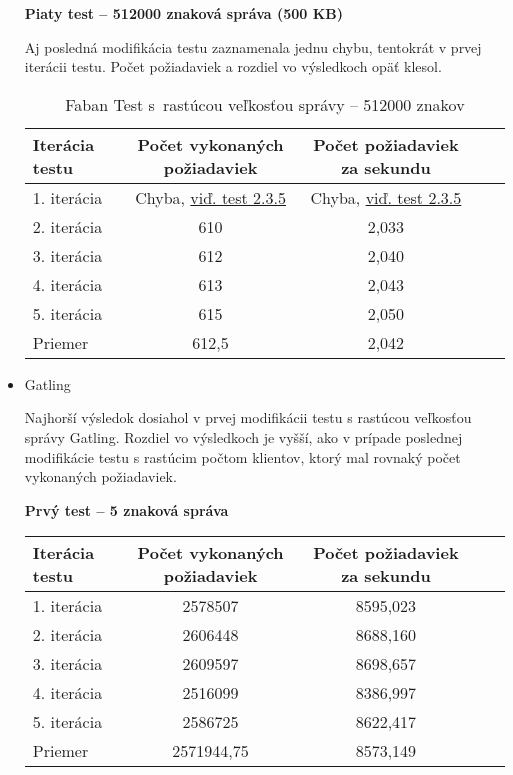 \documentclass[12pt,oneside,final]{fithesis-utf8}
\begin{document}
\begin{itemize}
\textbf{Piaty test -- 512000 znaková správa (500 KB)}

Aj posledná modifikácia testu zaznamenala jednu chybu, tentokrát v prvej iterácii testu. Počet požiadaviek a rozdiel vo výsledkoch opäť klesol.

\begin{table}[H]
\begin{center}
\begin{tabular}{ | l | c | c | c | c |}
		\hline
		 \textbf{Iterácia testu} & \textbf{Počet vykonaných požiadaviek} & \textbf{Počet požiadaviek za sekundu} \\ \hline
		 1. iterácia & Chyba, \hyperlink{label}{viď. test 2.3.5} & Chyba, \hyperlink{label}{viď. test 2.3.5} \\ \hline
		 2. iterácia & 610 & 2,033 \\ \hline
		 3. iterácia & 612 & 2,040 \\ \hline
		 4. iterácia & 613 & 2,043 \\ \hline
		 5. iterácia & 615 & 2,050 \\ \hline
		 Priemer & 612,5 & 2,042 \\ \hline
		 
\end{tabular}
\end{center}
\caption{Faban Test s~rastúcou veľkosťou správy -- 512000 znakov}
\end{table}


\item Gatling

Najhorší výsledok dosiahol v prvej modifikácii testu s rastúcou veľkosťou správy Gatling. Rozdiel vo výsledkoch je vyšší, ako v prípade poslednej modifikácie testu s rastúcim počtom klientov, ktorý mal rovnaký počet vykonaných požiadaviek. 

\textbf{Prvý test -- 5 znaková správa}

\begin{table}[H]
\begin{center}
\begin{tabular}{ | l | c | c | c | c |}
		\hline
		 \textbf{Iterácia testu} & \textbf{Počet vykonaných požiadaviek} & \textbf{Počet požiadaviek za sekundu} \\ \hline
		 1. iterácia & 2578507 & 8595,023 \\ \hline
		 2. iterácia & 2606448 & 8688,160 \\ \hline
		 3. iterácia & 2609597 & 8698,657 \\ \hline
		 4. iterácia & 2516099 & 8386,997 \\ \hline
		 5. iterácia & 2586725 & 8622,417 \\ \hline
		 Priemer & 2571944,75 & 8573,149 \\ \hline
		 

\end{tabular}
\end{center}
\end{table}
\end{itemize}
\end{document}
